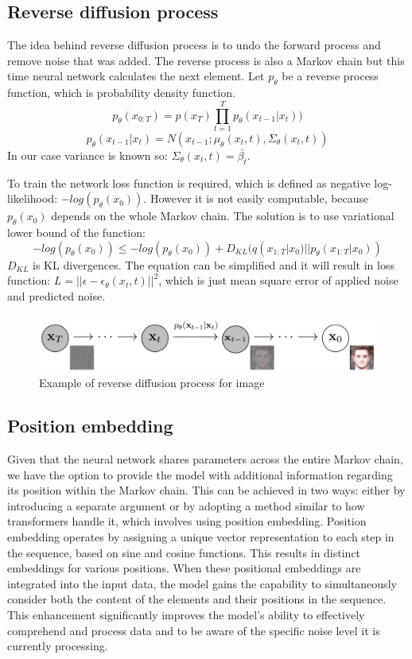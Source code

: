 \documentclass[11pt,a4paper]{report}
\begin{document}
\subsection{Reverse diffusion process}
The idea behind reverse diffusion process is to undo the forward process and remove noise that was added. The reverse process is  also a Markov chain but this time neural network calculates the next element. Let $p_\theta$ be a reverse process function, which is probability density function.
\[p_\theta(x_{0:T}) = p(x_T)\prod_{t=1}^{T}{p_\theta(x_{t-1}|x_t)})\]
\[p_\theta(x_{t-1}|x_t) = N(x_{t-1};\mu_\theta(x_t, t), \Sigma_\theta(x_t,t))\]
In our case variance is known so: $\Sigma_\theta(x_t,t)=\bar{\beta_t}$.

To train the network loss function is required, which is defined as negative \break log-likelihood: $-log(p_\theta(x_0))$. However it is not easily computable, because $p_\theta(x_0)$ depends on the whole Markov chain. The solution is to use variational lower bound of the function:
\[-log(p_\theta(x_0)) \le -log(p_\theta(x_0)) + D_{KL}(q(x_{1:T}|x_0)||p_\theta(x_{1:T}|x_0))\]
$D_{KL}$ is KL divergences. The equation can be simplified \cite{ImprovedDDPM} and it will result in loss function: $L=||\epsilon - \epsilon_\theta(x_t, t)||^2$, which is just mean square error of applied noise and predicted noise.

\begin{figure}[H]
	\centering
	\includegraphics[width=\textwidth]{images/reverse-diffusion}
    \caption{Example of reverse diffusion process for image \cite{DDPM}}
\end{figure}

\subsection{Position embedding}
Given that the neural network shares parameters across the entire Markov chain, we have the option to provide the model with additional information regarding its position within the Markov chain. This can be achieved in two ways: either by introducing a separate argument or by adopting a method similar to how transformers handle it, which involves using position embedding. Position embedding operates by assigning a unique vector representation to each step in the sequence, based on sine and cosine functions. This results in distinct embeddings for various positions. When these positional embeddings are integrated into the input data, the model gains the capability to simultaneously consider both the content of the elements and their positions in the sequence. This enhancement significantly improves the model's ability to effectively comprehend and process data and to be aware of the specific noise level it is currently processing. \cite{positionEmbedding_hf} \cite{AttentionIsAll}
\end{document}
